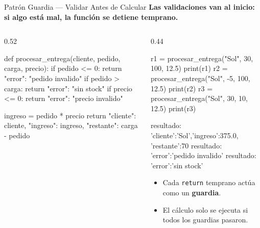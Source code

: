 \documentclass[aspectratio=169, 11pt]{beamer}
\begin{document}
\begin{frame}[fragile,shrink=28]{Patrón Guardia --- Validar Antes de Calcular}
  \vspace{-6pt}
  {\footnotesize\color{arcaDark}\bfseries
    Las validaciones van \textbf{al inicio}:
    si algo está mal, la función se detiene temprano.}

  \vspace{4pt}
  \begin{columns}[T]
    \begin{column}{0.52\textwidth}
      \begin{pyblock}
def procesar_entrega(cliente, pedido,
                     carga, precio):
    if pedido <= 0:
        return {"error": "pedido invalido"}
    if pedido > carga:
        return {"error": "sin stock"}
    if precio <= 0:
        return {"error": "precio invalido"}

    ingreso = pedido * precio
    return {
        "cliente": cliente,
        "ingreso": ingreso,
        "restante": carga - pedido
    }
      \end{pyblock}
    \end{column}

    \begin{column}{0.44\textwidth}
      \begin{pyblock}
r1 = procesar_entrega("Sol", 30, 100, 12.5)
print(r1)
r2 = procesar_entrega("Sol", -5, 100, 12.5)
print(r2)
r3 = procesar_entrega("Sol", 30, 10, 12.5)
print(r3)
      \end{pyblock}
      \vspace{-2pt}
      \begin{outputblock}
resultado: {'cliente':'Sol','ingreso':375.0,
  'restante':70}
resultado: {'error':'pedido invalido'}
resultado: {'error':'sin stock'}
      \end{outputblock}

      \vspace{2pt}
      {\scriptsize\color{textMuted}
      \begin{itemize}\setlength{\itemsep}{3pt}
        \item[{\color{arcaRed}\scriptsize\faArrowRight}]
          Cada \texttt{return} temprano
          actúa como un \textbf{guardia}.
        \item[{\color{arcaRed}\scriptsize\faLightbulb}]
          El cálculo solo se ejecuta
          si todos los guardias pasaron.
      \end{itemize}
      }
    \end{column}
  \end{columns}
\end{frame}
\end{document}

